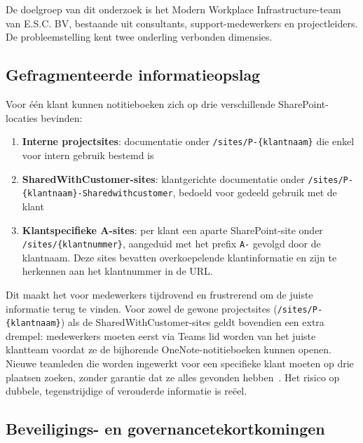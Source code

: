 \section{}%
\label{sec:probleemstelling}

De doelgroep van dit onderzoek is het Modern Workplace Infrastructure-team van E.S.C. BV, bestaande uit consultants, support-medewerkers en projectleiders. De probleemstelling kent twee onderling verbonden dimensies.

\subsection{Gefragmenteerde informatieopslag}

Voor één klant kunnen notitieboeken zich op drie verschillende SharePoint-locaties bevinden:
\begin{enumerate}
  \item \textbf{Interne projectsites}: documentatie onder \texttt{/sites/P-\{klantnaam\}} die enkel voor intern gebruik bestemd is
  \item \textbf{SharedWithCustomer-sites}: klantgerichte documentatie onder \texttt{/sites/P-\{klantnaam\}-Shared\-withcustomer}, bedoeld voor gedeeld gebruik met de klant
  \item \textbf{Klantspecifieke A-sites}: per klant een aparte SharePoint-site onder \texttt{/sites/\{klantnummer\}}, aangeduid met het prefix \texttt{A-} gevolgd door de klantnaam. Deze sites bevatten overkoepelende klantinformatie en zijn te herkennen aan het klantnummer in de URL.
\end{enumerate}

Dit maakt het voor medewerkers tijdrovend en frustrerend om de juiste informatie terug te vinden. Voor zowel de gewone projectsites (\texttt{/sites/P-\{klantnaam\}}) als de SharedWithCustomer-sites geldt bovendien een extra drempel: medewerkers moeten eerst via Teams lid worden van het juiste klantteam voordat ze de bijhorende OneNote-notitieboeken kunnen openen. Nieuwe teamleden die worden ingewerkt voor een specifieke klant moeten op drie plaatsen zoeken, zonder garantie dat ze alles gevonden hebben~\autocite{tomsu2024infooverload}. Het risico op dubbele, tegenstrijdige of verouderde informatie is reëel.

\subsection{Beveiligings- en governancetekortkomingen}

